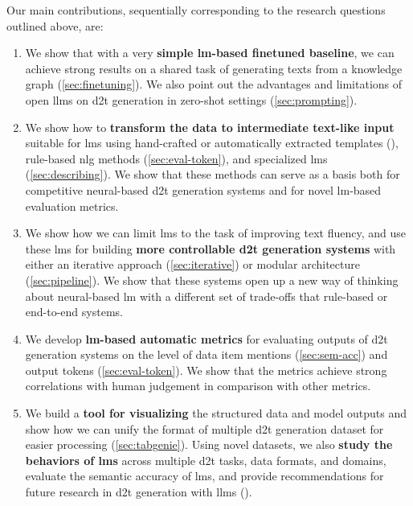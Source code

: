 Our main contributions, sequentially corresponding to the research questions outlined above, are:
\begin{enumerate}
    \item We show that with a very \textbf{simple \ac{lm}-based finetuned baseline}, we can achieve strong results on a shared task of generating texts from a knowledge graph (\autoref{sec:finetuning}). We also point out the advantages and limitations of open \acp{llm} on \ac{d2t} generation in zero-shot settings (\autoref{sec:prompting}).
    \item We show how to \textbf{transform the data to intermediate text-like input} suitable for \acp{lm} using hand-crafted or automatically extracted templates (), rule-based \ac{nlg} methods (\autoref{sec:eval-token}), and specialized \acp{lm} (\autoref{sec:describing}). We show that these methods can serve as a basis both for competitive neural-based \ac{d2t} generation systems and for novel \ac{lm}-based evaluation metrics.
    \item We show how we can limit \acp{lm} to the task of improving text fluency, and use these \acp{lm} for building \textbf{more controllable \ac{d2t} generation systems} with either an iterative approach (\autoref{sec:iterative}) or modular architecture (\autoref{sec:pipeline}). We show that these systems open up a new way of thinking about neural-based \ac{lm} with a different set of trade-offs that rule-based or end-to-end systems.
    \item We develop \textbf{\ac{lm}-based automatic metrics} for evaluating outputs of \ac{d2t} generation systems on the level of data item mentions (\autoref{sec:sem-acc}) and output tokens (\autoref{sec:eval-token}). We show that the metrics achieve strong correlations with human judgement in comparison with other metrics.
    \item We build a \textbf{tool for visualizing} the structured data and model outputs and show how we can unify the format of multiple \ac{d2t} generation dataset for easier processing (\autoref{sec:tabgenie}). Using novel datasets, we also \textbf{study the behaviors of \acp{lm}} across multiple \ac{d2t} tasks, data formats, and domains, evaluate the semantic accuracy of \acp{lm}, and provide recommendations for future research in \ac{d2t} generation with \acp{llm} ().
\end{enumerate}



